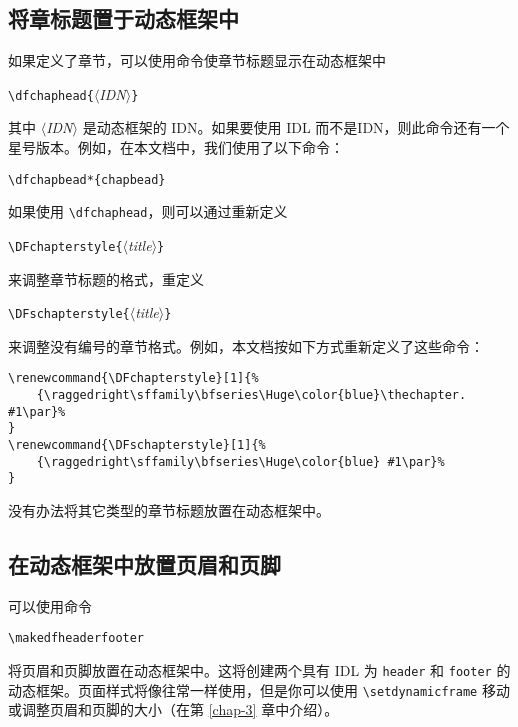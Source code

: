 \documentclass[a4paper]{book}%
\renewcommand{\DFchapterstyle}[1]{%
    {\raggedright\sffamily\bfseries\Huge\color{blue}\thechapter. #1\par}%
}
\renewcommand{\DFschapterstyle}[1]{%
    {\raggedright\sffamily\bfseries\Huge\color{blue}#1\par}%
}
\newcommand{\meta}[1]{\textnormal{\ensuremath{\langle}\makebox[0pt][l]{}\emph{#1}\makebox[0pt][l]{}\ensuremath{\rangle}}}
\newcommand{\cmd}[1]{\texttt{#1}}
\begin{document}
\subsection{将章标题置于动态框架中}\label{sec-2-3-1}\label{page-12}%
如果定义了章节，可以使用命令使章节标题显示在动态框架中
\begin{mdframed}
\verb|\dfchaphead{|\meta{IDN}\verb|}|
\end{mdframed}
其中 \meta{IDN} 是动态框架的 IDN。如果要使用 IDL 而不是IDN，则此命令还有一个星号版本。例如，在本文档中，我们使用了以下命令：
\begin{mdframed}[backgroundcolor=white]
\verb|\dfchapbead*{chapbead}|
\end{mdframed}

如果使用 \verb|\dfchaphead|，则可以通过重新定义
\begin{mdframed}
\verb|\DFchapterstyle{|\meta{title}\verb|}|
\end{mdframed}
来调整章节标题的格式，重定义
\begin{mdframed}
\verb|\DFschapterstyle{|\meta{title}\verb|}|
\end{mdframed}
来调整没有编号的章节格式。例如，本文档按如下方式重新定义了这些命令：
\begin{lstlisting}[backgroundcolor=\color{white}]
\renewcommand{\DFchapterstyle}[1]{%
    {\raggedright\sffamily\bfseries\Huge\color{blue}\thechapter. #1\par}%
}
\renewcommand{\DFschapterstyle}[1]{%
    {\raggedright\sffamily\bfseries\Huge\color{blue} #1\par}%
}
\end{lstlisting}
没有办法将其它类型的章节标题放置在动态框架中。
\subsection{在动态框架中放置页眉和页脚}%
可以使用命令
\begin{mdframed}
\verb|\makedfheaderfooter|
\end{mdframed}
将页眉和页脚放置在动态框架中。这将创建两个具有 IDL 为 \cmd{header} 和 \cmd{footer} 的动态框架。页面样式将像往常一样使用，但是你可以使用 \verb|\setdynamicframe| 移动或调整页眉和页脚的大小（在第 \ref{chap-3} 章中介绍）。
\end{document}
